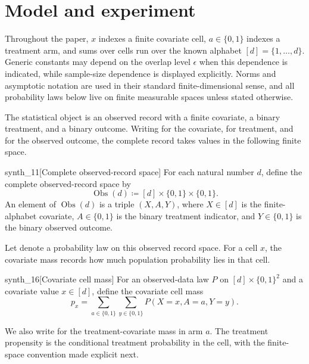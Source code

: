 \section{Model and experiment}\label{sec:model}

Throughout the paper, \(x\) indexes a finite covariate cell, \(a\in\{0,1\}\) indexes a treatment arm, and sums over cells run over the known alphabet \([d]=\{1,\ldots,d\}\). Generic constants may depend on the overlap level \(\epsilon\) when this dependence is indicated, while sample-size dependence is displayed explicitly. Norms and asymptotic notation are used in their standard finite-dimensional sense, and all probability laws below live on finite measurable spaces unless stated otherwise.

The statistical object is an observed record with a finite covariate, a binary treatment, and a binary outcome. Writing  for the covariate,  for treatment, and  for the observed outcome, the complete record takes values in the following finite space.

\begin{definitionv}{synth_11}[Complete observed-record space]
For each natural number \(d\), define the complete observed-record space by
\[
\operatorname{Obs}(d)\coloneqq [d]\times\{0,1\}\times\{0,1\}.
\]
An element of \(\operatorname{Obs}(d)\) is a triple \((X,A,Y)\), where \(X\in[d]\) is the finite-alphabet covariate, \(A\in\{0,1\}\) is the binary treatment indicator, and \(Y\in\{0,1\}\) is the binary observed outcome.
\end{definitionv}

Let  denote a probability law on this observed record space. For a cell \(x\), the covariate mass  records how much population probability lies in that cell.

\begin{definitionv}{synth_16}[Covariate cell mass]
For an observed-data law \(P\) on \([d]\times\{0,1\}^2\) and a covariate value \(x\in[d]\), define the covariate cell mass
\[
p_x
=
\sum_{a\in\{0,1\}}\sum_{y\in\{0,1\}}
P(X=x,A=a,Y=y).
\]
\end{definitionv}

We also write  for the treatment-covariate mass in arm \(a\). The treatment propensity  is the conditional treatment probability in the cell, with the finite-space convention made explicit next.

